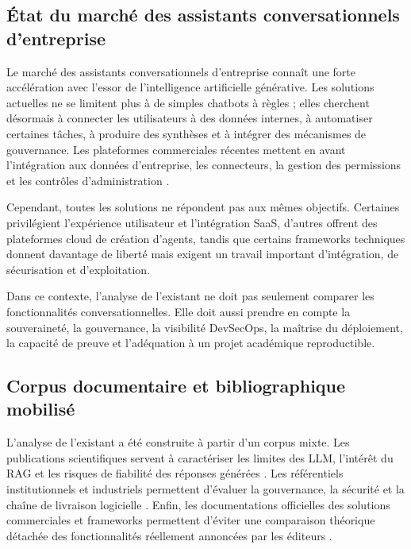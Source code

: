 \subsection{État du marché des assistants conversationnels d’entreprise}

Le marché des assistants conversationnels d’entreprise connaît une forte accélération avec l’essor de l’intelligence artificielle générative. Les solutions actuelles ne se limitent plus à de simples chatbots à règles ; elles cherchent désormais à connecter les utilisateurs à des données internes, à automatiser certaines tâches, à produire des synthèses et à intégrer des mécanismes de gouvernance. Les plateformes commerciales récentes mettent en avant l’intégration aux données d’entreprise, les connecteurs, la gestion des permissions et les contrôles d’administration \cite{openai_enterprise_admin_2026,microsoft_copilot_studio_2026,aws_q_business_2026,google_agent_platform_2026,ibm_watsonx_2026}.

Cependant, toutes les solutions ne répondent pas aux mêmes objectifs. Certaines privilégient l’expérience utilisateur et l’intégration SaaS, d’autres offrent des plateformes cloud de création d’agents, tandis que certains frameworks techniques donnent davantage de liberté mais exigent un travail important d’intégration, de sécurisation et d’exploitation.

Dans ce contexte, l’analyse de l’existant ne doit pas seulement comparer les fonctionnalités conversationnelles. Elle doit aussi prendre en compte la souveraineté, la gouvernance, la visibilité DevSecOps, la maîtrise du déploiement, la capacité de preuve et l’adéquation à un projet académique reproductible.

\subsection{Corpus documentaire et bibliographique mobilisé}

L’analyse de l’existant a été construite à partir d’un corpus mixte. Les publications scientifiques servent à caractériser les limites des LLM, l’intérêt du RAG et les risques de fiabilité des réponses générées \cite{lewis_rag_2020,gao_rag_survey_2024,ji_hallucination_survey_2023}. Les référentiels institutionnels et industriels permettent d’évaluer la gouvernance, la sécurité et la chaîne de livraison logicielle \cite{nist_ai_rmf_2023,nist_ssdf_800_218,owasp_llm_top10_2025,slsa_spec_v1}. Enfin, les documentations officielles des solutions commerciales et frameworks permettent d’éviter une comparaison théorique détachée des fonctionnalités réellement annoncées par les éditeurs \cite{openai_enterprise_admin_2026,microsoft_copilot_studio_2026,aws_q_business_2026,google_agent_platform_2026,ibm_watsonx_2026,rasa_docs_2026,botpress_docs_2026,langchain_retrieval_2026,langgraph_agentic_rag_2026}.

